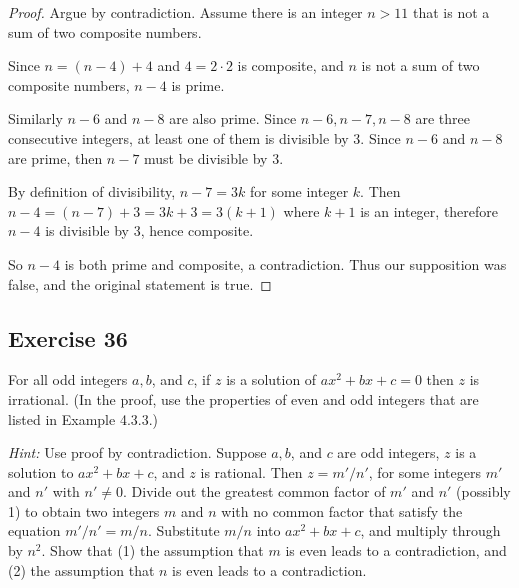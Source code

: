\documentclass[14pt]{extarticle}
\begin{document}
\begin{proof}
Argue by contradiction. Assume there is an integer $n > 11$ that is not a sum of two composite numbers.

Since $n = (n-4) + 4$ and $4 = 2 \cdot 2$ is composite, and $n$ is not a sum of two composite numbers, $n-4$ is prime.

Similarly $n-6$ and $n-8$ are also prime. Since $n-6, n-7, n-8$ are three consecutive integers, at least one of them is divisible by 3. Since $n-6$ and $n-8$ are prime, then $n-7$ must be divisible by 3.

By definition of divisibility, $n-7 = 3k$ for some integer $k$. Then $n-4 = (n-7)+3 = 3k+3 = 3(k+1)$ where $k+1$ is an integer, therefore $n-4$ is divisible by 3, hence composite.

So $n-4$ is both prime and composite, a contradiction. Thus our supposition was false, and the original statement is true.
\end{proof}

\subsection{Exercise 36}
For all odd integers $a, b$, and $c$, if $z$ is a solution of $ax^2 + bx + c = 0$ then $z$ is irrational. (In the proof, use the properties of even and odd integers that
are listed in Example 4.3.3.)

{\it Hint:} Use proof by contradiction. Suppose $a, b$, and $c$ are odd integers, $z$ is a solution to $ax^2 + bx + c$, and $z$ is rational. Then $z = m'/n'$, for some integers $m'$ and $n'$ with $n' \neq 0$. Divide out the greatest common factor of $m'$ and $n'$ (possibly 1) to obtain two integers $m$ and $n$ with no common factor that satisfy the equation $m'/n' = m/n$. Substitute $m/n$ into $ax^2 + bx + c$, and multiply through by $n^2$. Show that (1) the assumption that $m$ is even leads to a contradiction, and (2) the assumption that $n$ is even leads to a contradiction.
\end{document}
